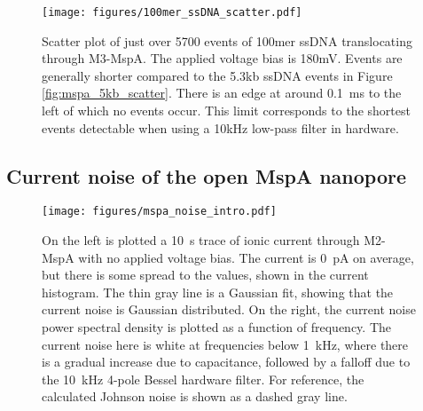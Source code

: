 \begin{figure}[h]
\begin{centering}
\texttt{[image: figures/100mer\_ssDNA\_scatter.pdf]}
\caption[Scatter plot of 100mer ssDNA in MspA]{Scatter plot of just over 5700 events of 100mer ssDNA translocating through M3-MspA.  The applied voltage bias is 180mV.  Events are generally shorter compared to the 5.3kb ssDNA events in Figure \ref{fig:mspa_5kb_scatter}.  There is an edge at around \SI{0.1}{ms} to the left of which no events occur.  This limit corresponds to the shortest events detectable when using a 10kHz low-pass filter in hardware.}
\label{fig:mspa_100mer_scatter}
\end{centering}
\end{figure}

\subsection{Current noise of the open MspA nanopore}

\begin{figure}[h]
\begin{centering}
\texttt{[image: figures/mspa\_noise\_intro.pdf]}
\caption[Current noise in the MspA nanopore]{On the left is plotted a \SI{10}{\s} trace of ionic current through M2-MspA with no applied voltage bias.  The current is \SI{0}{\pA} on average, but there is some spread to the values, shown in the current histogram.  The thin gray line is a Gaussian fit, showing that the current noise is Gaussian distributed.  On the right, the current noise power spectral density is plotted as a function of frequency.  The current noise here is white at frequencies below \SI{1}{\kHz}, where there is a gradual increase due to capacitance, followed by a falloff due to the \SI{10}{\kHz} 4-pole Bessel hardware filter.  For reference, the calculated Johnson noise is shown as a dashed gray line.}
\label{fig:mspa_noise_intro}
\end{centering}
\end{figure}